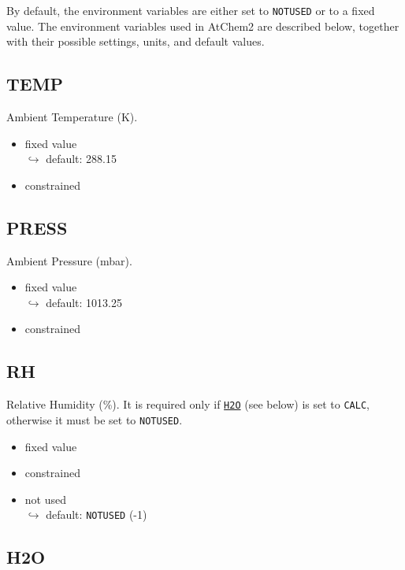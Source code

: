 By default, the environment variables are either set to
\texttt{NOTUSED} or to a fixed value. The environment variables used
in AtChem2 are described below, together with their possible settings,
units, and default values.

\subsection{TEMP} \label{subsec:temp}

Ambient Temperature (K).

\begin{itemize}
\item fixed value\\$\hookrightarrow$ default: 288.15
\item constrained
\end{itemize}

\subsection{PRESS} \label{subsec:press}

Ambient Pressure (mbar).

\begin{itemize}
\item fixed value\\$\hookrightarrow$ default: 1013.25
\item constrained
\end{itemize}

\subsection{RH} \label{subsec:rh}

Relative Humidity (\%). It is required only if \hyperref[subsec:h2o]{\texttt{H2O}}
(see below) is set to \texttt{CALC}, otherwise it must be set to
\texttt{NOTUSED}.

\begin{itemize}
\item fixed value
\item constrained
\item not used\\$\hookrightarrow$ default: \texttt{NOTUSED} (-1)
\end{itemize}

\subsection{H2O} \label{subsec:h2o}

